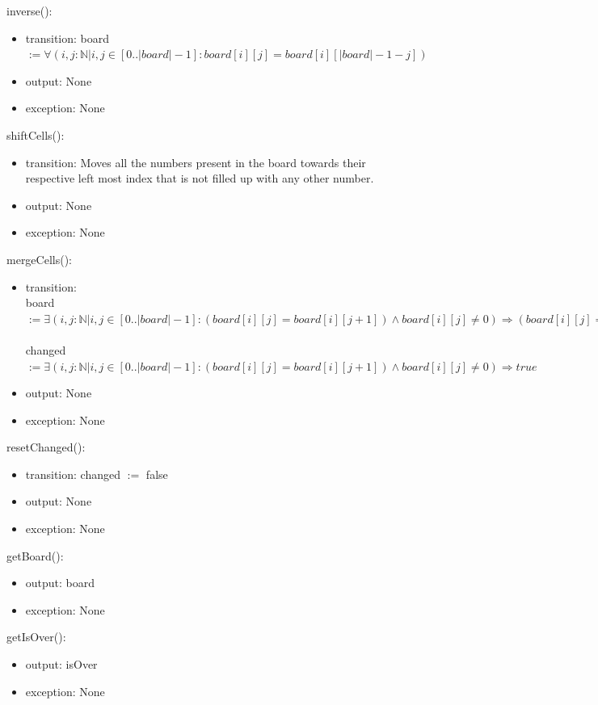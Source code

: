 \documentclass[12pt]{article}
\begin{document}
\noindent inverse():
\begin{itemize}
    \item transition: board $:= \forall (i, j: \mathbb{N} | i, j \in [0..|board|-1] : board[i][j] = board[i][|board|-1-j])$
    \item output: None 
    \item exception: None
\end{itemize}

\noindent shiftCells():
\begin{itemize}
    \item transition: Moves all the numbers present in the board towards their respective left most index that is not filled up with any other number.
    \item output: None 
    \item exception: None
\end{itemize}

\noindent mergeCells():
\begin{itemize}
    \item transition: \\ board $:= \exists (i, j: \mathbb{N} | i, j \in [0..|board|-1] : (board[i][j] = board[i][j + 1]) \wedge board[i][j] \neq 0) \Rightarrow (board[i][j] = board[i][j] * 2) \wedge (board[i][j + 1] = 0))$ \\\\
    changed $:= \exists (i, j: \mathbb{N} | i, j \in [0..|board|-1] : (board[i][j] = board[i][j + 1]) \wedge board[i][j] \neq 0) \Rightarrow true$
    \item output: None 
    \item exception: None
\end{itemize}

\noindent resetChanged():
\begin{itemize}
    \item transition: changed $:=$ false
    \item output: None 
    \item exception: None
\end{itemize}

\noindent getBoard():
\begin{itemize}
    \item output: board
    \item exception: None
\end{itemize}

\noindent getIsOver():
\begin{itemize}
    \item output: isOver
    \item exception: None
\end{itemize}
\end{document}
